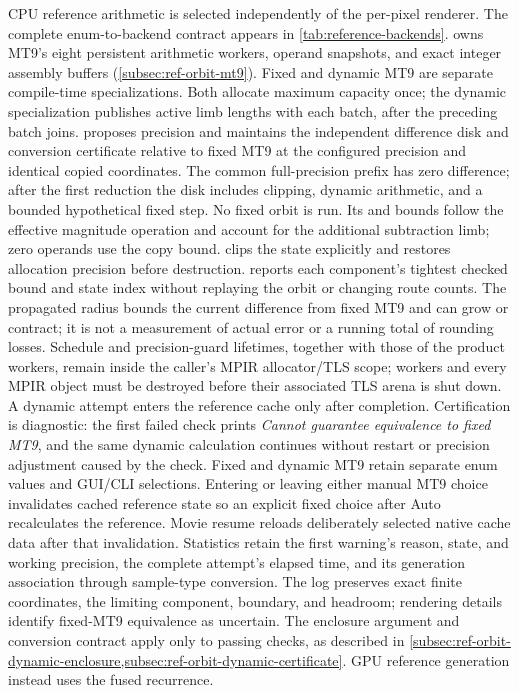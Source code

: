 CPU reference arithmetic is selected independently of the per-pixel renderer.
The complete enum-to-backend contract appears in \cref{tab:reference-backends}.
owns MT9's eight persistent
arithmetic workers, operand snapshots, and exact integer assembly buffers
(\cref{subsec:ref-orbit-mt9}). Fixed and dynamic MT9 are separate compile-time
specializations. Both allocate maximum capacity once; the dynamic specialization
publishes active limb lengths with each batch, after the preceding batch joins.
 proposes precision and maintains the independent
difference disk and conversion certificate relative to fixed MT9 at the configured
precision and identical copied coordinates. The common full-precision prefix
has zero difference; after the first reduction the disk includes clipping,
dynamic arithmetic, and a bounded hypothetical fixed step. No fixed orbit is run.
Its  and 
bounds follow the effective magnitude operation and account for the additional
subtraction limb; zero operands use the copy bound.  clips
the state explicitly and restores allocation precision before destruction.
 reports each component's tightest checked
bound and state index without replaying the orbit or changing route counts.
The propagated radius bounds the current difference from fixed MT9 and can grow or contract;
it is not a measurement of actual error or a running total of rounding losses.
Schedule and precision-guard lifetimes, together with those of the product workers,
remain inside the caller's MPIR allocator/TLS scope; workers and every MPIR object must be destroyed before
their associated TLS arena is shut down. A dynamic attempt enters the reference
cache only after completion. Certification is diagnostic: the first failed
check prints \emph{Cannot guarantee equivalence to fixed MT9}, and the same dynamic calculation continues without
restart or precision adjustment caused by the check. Fixed and dynamic MT9
retain separate enum values and GUI/CLI selections. Entering or leaving either
manual MT9 choice invalidates cached reference state so an explicit fixed choice
after Auto recalculates the reference. Movie resume reloads deliberately selected
native cache data after that invalidation. Statistics retain
the first warning's reason, state, and working precision, the complete attempt's
elapsed time, and its generation association through sample-type conversion.
The log preserves exact finite coordinates, the limiting component, boundary,
and headroom; rendering details identify fixed-MT9 equivalence as uncertain. The enclosure
argument and conversion contract apply only to passing checks, as described in
\cref{subsec:ref-orbit-dynamic-enclosure,subsec:ref-orbit-dynamic-certificate}.
GPU reference generation instead uses the fused  recurrence.

